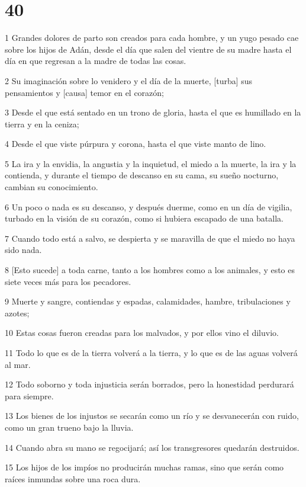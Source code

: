 \chapter{40}

\par 1 Grandes dolores de parto son creados para cada hombre, y un yugo pesado cae sobre los hijos de Adán, desde el día que salen del vientre de su madre hasta el día en que regresan a la madre de todas las cosas.
\par 2 Su imaginación sobre lo venidero y el día de la muerte, [turba] sus pensamientos y [causa] temor en el corazón;
\par 3 Desde el que está sentado en un trono de gloria, hasta el que es humillado en la tierra y en la ceniza;
\par 4 Desde el que viste púrpura y corona, hasta el que viste manto de lino.
\par 5 La ira y la envidia, la angustia y la inquietud, el miedo a la muerte, la ira y la contienda, y durante el tiempo de descanso en su cama, su sueño nocturno, cambian su conocimiento.
\par 6 Un poco o nada es su descanso, y después duerme, como en un día de vigilia, turbado en la visión de su corazón, como si hubiera escapado de una batalla.
\par 7 Cuando todo está a salvo, se despierta y se maravilla de que el miedo no haya sido nada.
\par 8 [Esto sucede] a toda carne, tanto a los hombres como a los animales, y esto es siete veces más para los pecadores.
\par 9 Muerte y sangre, contiendas y espadas, calamidades, hambre, tribulaciones y azotes;
\par 10 Estas cosas fueron creadas para los malvados, y por ellos vino el diluvio.
\par 11 Todo lo que es de la tierra volverá a la tierra, y lo que es de las aguas volverá al mar.
\par 12 Todo soborno y toda injusticia serán borrados, pero la honestidad perdurará para siempre.
\par 13 Los bienes de los injustos se secarán como un río y se desvanecerán con ruido, como un gran trueno bajo la lluvia.
\par 14 Cuando abra su mano se regocijará; así los transgresores quedarán destruidos.
\par 15 Los hijos de los impíos no producirán muchas ramas, sino que serán como raíces inmundas sobre una roca dura.
